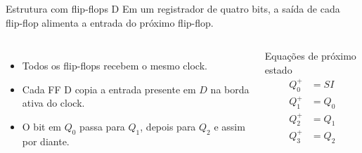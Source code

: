 \begin{frame}{Estrutura com flip-flops D}
Em um registrador de quatro bits, a saída de cada flip-flop alimenta a entrada
do próximo flip-flop.

\begin{columns}
\begin{itemize}
  \item Todos os flip-flops recebem o mesmo clock.
  \item Cada FF D copia a entrada presente em \(D\) na borda ativa do clock.
  \item O bit em \(Q_0\) passa para \(Q_1\), depois para \(Q_2\) e assim por diante.
\end{itemize}

\begin{block}{Equações de próximo estado}
\[\begin{aligned}
Q_0^+ &= SI\\
Q_1^+ &= Q_0\\
Q_2^+ &= Q_1\\
Q_3^+ &= Q_2
\end{aligned}\]
\end{block}
\end{columns}
\end{frame}